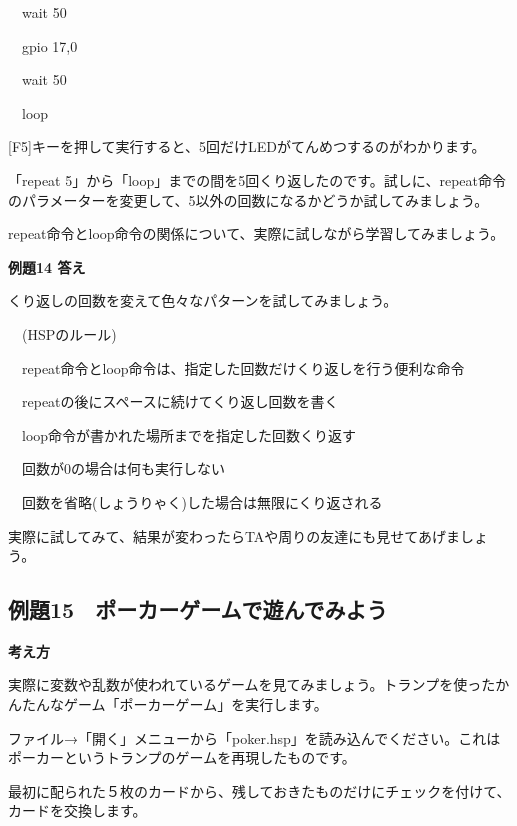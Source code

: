 \documentclass[a4paper,12pt]{jarticle}
\begin{document}
\ \ wait 50

\ \ gpio 17,0

\ \ wait 50

\ \ loop

\bigskip

[F5]キーを押して実行すると、5回だけLEDがてんめつするのがわかります。

「repeat
5」から「loop」までの間を5回くり返したのです。試しに、repeat命令のパラメーターを変更して、5以外の回数になるかどうか試してみましょう。

repeat命令とloop命令の関係について、実際に試しながら学習してみましょう。

\bigskip
\bigskip

{\bfseries
例題14 答え}

\bigskip

くり返しの回数を変えて色々なパターンを試してみましょう。

\bigskip

\ \ (HSPのルール)

\bigskip

\ \ repeat命令とloop命令は、指定した回数だけくり返しを行う便利な命令

\ \ repeatの後にスペースに続けてくり返し回数を書く

\ \ loop命令が書かれた場所までを指定した回数くり返す

\ \ 回数が0の場合は何も実行しない

\ \ 回数を省略(しょうりゃく)した場合は無限にくり返される


\bigskip

実際に試してみて、結果が変わったらTAや周りの友達にも見せてあげましょう。




\clearpage
\subsection{例題15　ポーカーゲームで遊んでみよう}
\bigskip
\bigskip

{\bfseries
考え方}

\bigskip

実際に変数や乱数が使われているゲームを見てみましょう。トランプを使ったかんたんなゲーム「ポーカーゲーム」を実行します。

ファイル→「開く」メニューから「poker.hsp」を読み込んでください。これはポーカーというトランプのゲームを再現したものです。

最初に配られた５枚のカードから、残しておきたものだけにチェックを付けて、カードを交換します。
\end{document}
